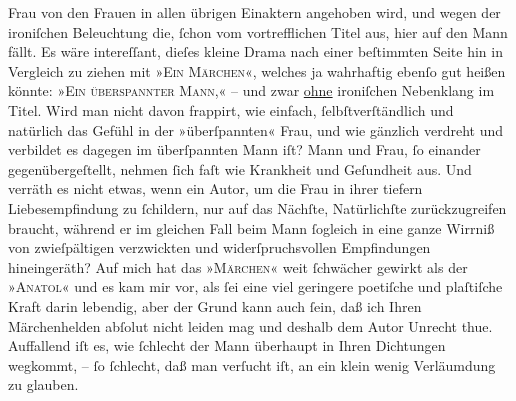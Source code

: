 \begin{ledgroupsized}[t]{13cm}
                    Frau von den Frauen {\pb}in allen übrigen
                    Einaktern angehoben wird, und wegen der ironiſchen Beleuchtung die, ſchon vom
                    vortrefflichen Titel aus, hier auf den Mann fällt. Es wäre intereſſant, dieſes
                    kleine Drama nach einer beſtimmten Seite hin in Vergleich zu ziehen mit
                        »\textsc{Ein Märchen}«, welches ja wahrhaftig ebenſo gut heißen könnte: »\textsc{Ein überspannter Mann},« – und zwar \uline{ohne} ironiſchen Nebenklang im Titel. Wird man nicht
                    davon frappirt, wie einfach, ſelbſtverſtändlich und natürlich das Gefühl in der
                    »überſpannten« Frau, und wie gänzlich verdreht und verbildet es dagegen im
                    überſpannten Mann iſt? Mann und Frau, ſo einander gegenübergeſtellt, nehmen ſich
                    faſt wie Krankheit und Geſundheit aus. Und verräth es nicht etwas, wenn ein Autor, um die Frau in ihrer tiefern
                    Liebesempfindung zu ſchildern, nur auf das Nächſte, Natürlichſte zurückzugreifen
                    braucht, während er im gleichen Fall beim Mann ſogleich in {\pb}eine ganze Wirrniß von zwieſpältigen
                    verzwickten und widerſpruchsvollen Empfindungen hineingeräth? Auf mich hat das
                        »\textsc{Märchen}« weit ſchwächer gewirkt als der »\textsc{Anatol}« und es kam mir vor, als ſei eine viel geringere poetiſche und
                    plaſtiſche Kraft darin lebendig, aber der Grund kann auch ſein, daß ich Ihren
                    Märchenhelden abſolut nicht leiden mag und deshalb dem Autor Unrecht thue.
                    Auffallend iſt es, wie ſchlecht der Mann überhaupt in Ihren Dichtungen wegkommt,
                    – ſo ſchlecht, daß man verſucht iſt, an ein klein wenig Verläumdung zu glauben.

\end{ledgroupsized}
